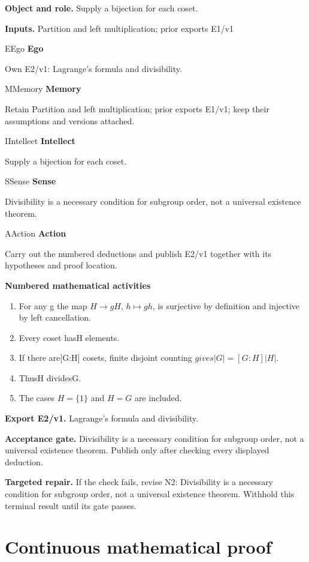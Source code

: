 \documentclass[preprint,12pt,aps,pra,showkeys,amsmath,amssymb,superscriptaddress,floatfix]{revtex4-2}
\theoremstyle{definition}
\theoremstyle{remark}
\newcommand{\mmfaculty}[3]{%
 \begin{mmfacultybox}{#1}{#2}
 {\sffamily\bfseries\color{MMBlue}#2}\par\smallskip #3
 \end{mmfacultybox}}
\newcommand{\field}[2]{\par\smallskip\noindent\textbf{#1.} #2\par}
\begin{document}
\field{Object and role}{Supply a bijection for each coset.}

\field{Inputs}{Partition and left multiplication; prior exports E1/v1}

\mmfaculty{E}{Ego}{Own E2/v1: Lagrange's formula and divisibility.}

\mmfaculty{M}{Memory}{Retain Partition and left multiplication; prior exports E1/v1; keep
their assumptions and versions attached.}

\mmfaculty{I}{Intellect}{Supply a bijection for each coset.}

\mmfaculty{S}{Sense}{Divisibility is a necessary condition for subgroup order, not a
universal existence theorem.}

\mmfaculty{A}{Action}{Carry out the numbered deductions and publish E2/v1 together with its
hypotheses and proof location.}

\smallskip\noindent\textbf{Numbered mathematical activities}

\begin{enumerate}[label=N2.\arabic*,leftmargin=3.4em]

\item For any g the map \(H\to gH\), \(h\mapsto gh\), is surjective by
definition and injective by left cancellation.

\item Every coset has\textbar H\textbar{} elements.

\item If there are{[}G:H{]} cosets, finite disjoint counting
\(gives|G|=[G:H]|H|\).

\item Thus\textbar H\textbar{} divides\textbar G\textbar.

\item The cases \(H=\{1\}\) and \(H=G\) are included.

\end{enumerate}

\field{Export E2/v1}{Lagrange's formula and divisibility.}

\field{Acceptance gate}{Divisibility is a necessary condition for subgroup order, not a
universal existence theorem. Publish only after checking every displayed
deduction.}

\field{Targeted repair}{If the check fails, revise N2: Divisibility is a necessary condition for
subgroup order, not a universal existence theorem. Withhold this
terminal result until its gate passes.}

\endgroup\clearpage\section{Continuous mathematical proof}\label{sec:proof}
\end{document}
